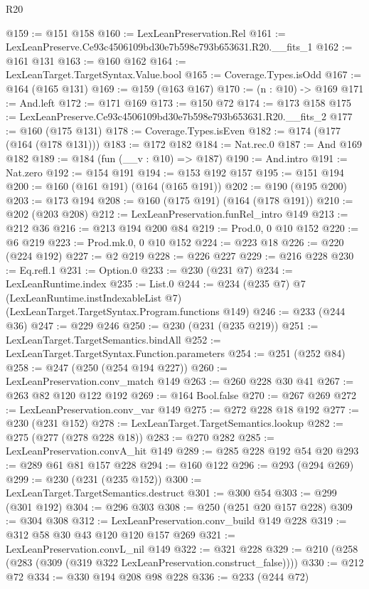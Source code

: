 \begin{lexlean}{R20}
\begin{coremodule}
@159 := @151 @158
@160 := LexLeanPreservation.Rel
@161 := LexLeanPreserve.Ce93c4506109bd30e7b598e793b653631.R20.__fits_1
@162 := @161 @131
@163 := @160 @162
@164 := LexLeanTarget.TargetSyntax.Value.bool
@165 := Coverage.Types.isOdd
@167 := @164 (@165 @131)
@169 := @159 (@163 @167)
@170 := (n : @10) -> @169
@171 := And.left
@172 := @171 @169
@173 := @150 @72
@174 := @173 @158
@175 := LexLeanPreserve.Ce93c4506109bd30e7b598e793b653631.R20.__fits_2
@177 := @160 (@175 @131)
@178 := Coverage.Types.isEven
@182 := @174 (@177 (@164 (@178 @131)))
@183 := @172 @182
@184 := Nat.rec.{0}
@187 := And @169 @182
@189 := @184 (fun (__v : @10) => @187)
@190 := And.intro
@191 := Nat.zero
@192 := @154 @191
@194 := @153 @192 @157
@195 := @151 @194
@200 := @160 (@161 @191) (@164 (@165 @191))
@202 := @190 (@195 @200)
@203 := @173 @194
@208 := @160 (@175 @191) (@164 (@178 @191))
@210 := @202 (@203 @208)
@212 := LexLeanPreservation.funRel_intro @149
@213 := @212 @36
@216 := @213 @194 @200 @84
@219 := Prod.{0, 0} @10 @152
@220 := @6 @219
@223 := Prod.mk.{0, 0} @10 @152
@224 := @223 @18
@226 := @220 (@224 @192)
@227 := @2 @219
@228 := @226 @227
@229 := @216 @228
@230 := Eq.refl.{1}
@231 := Option.{0}
@233 := @230 (@231 @7)
@234 := LexLeanRuntime.index
@235 := List.{0}
@244 := @234
    (@235 @7)
    @7
    (LexLeanRuntime.instIndexableList @7)
    (LexLeanTarget.TargetSyntax.Program.functions @149)
@246 := @233 (@244 @36)
@247 := @229 @246
@250 := @230 (@231 (@235 @219))
@251 := LexLeanTarget.TargetSemantics.bindAll
@252 := LexLeanTarget.TargetSyntax.Function.parameters
@254 := @251 (@252 @84)
@258 := @247 (@250 (@254 @194 @227))
@260 := LexLeanPreservation.conv_match @149
@263 := @260 @228 @30 @41
@267 := @263 @82 @120 @122 @192
@269 := @164 Bool.false
@270 := @267 @269
@272 := LexLeanPreservation.conv_var @149
@275 := @272 @228 @18 @192
@277 := @230 (@231 @152)
@278 := LexLeanTarget.TargetSemantics.lookup
@282 := @275 (@277 (@278 @228 @18))
@283 := @270 @282
@285 := LexLeanPreservation.convA_hit @149
@289 := @285 @228 @192 @54 @20
@293 := @289 @61 @81 @157 @228
@294 := @160 @122
@296 := @293 (@294 @269)
@299 := @230 (@231 (@235 @152))
@300 := LexLeanTarget.TargetSemantics.destruct
@301 := @300 @54
@303 := @299 (@301 @192)
@304 := @296 @303
@308 := @250 (@251 @20 @157 @228)
@309 := @304 @308
@312 := LexLeanPreservation.conv_build @149 @228
@319 := @312 @58 @30 @43 @120 @120 @157 @269
@321 := LexLeanPreservation.convL_nil @149
@322 := @321 @228
@329 := @210 (@258 (@283 (@309 (@319 @322 LexLeanPreservation.construct_false))))
@330 := @212 @72
@334 := @330 @194 @208 @98 @228
@336 := @233 (@244 @72)

\end{coremodule}
\end{lexlean}
